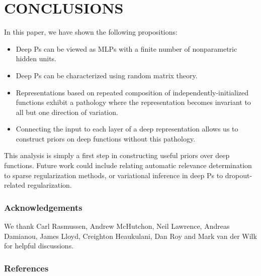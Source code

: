 \documentclass[twoside]{article}
\makeatletter
\newlength{\nonHumbleHeight}
\def\@humbleformat#1{{\settoheight{\nonHumbleHeight}{#1}\resizebox{!}{0.94\nonHumbleHeight}{#1}}}%
\def\humble#1{\@humbleformat{#1}}%
\newcommand{\gp}{{\humble GP}}
\newcommand{\sectiondist}{}
\makeatother
\begin{document}
\section{CONCLUSIONS}
\sectiondist

In this paper, we have shown the following propositions:

\begin{itemize}
\item Deep \gp{}s can be viewed as MLPs with a finite number of nonparametric hidden units.
\item Deep \gp{}s can be characterized using random matrix theory.
\item Representations based on repeated composition of independently-initialized functions exhibit a pathology where the representation becomes invariant to all but one direction of variation.
\item Connecting the input to each layer of a deep representation allows us to construct priors on deep functions without this pathology.
\end{itemize}

This analysis is simply a first step in constructing useful priors over deep functions.  Future work could include relating automatic relevance determination to sparse regularization methods, or variational inference in deep \gp{}s to dropout-related regularization.


\subsubsection*{Acknowledgements}
We thank Carl Rasmussen, Andrew McHutchon, Neil Lawrence, Andreas Damianou, James Lloyd, Creighton Heaukulani, Dan Roy and Mark van der Wilk for helpful discussions.

\subsubsection*{References}
\vspace{-0.3in}
\renewcommand{\refname}{}



\end{document}
